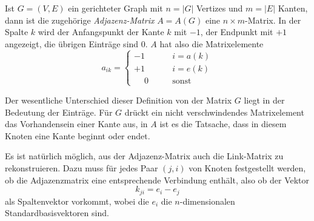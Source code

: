 \begin{definition}
\label{buch:def:adjazenz-matrix}
Ist $G=(V,E)$ ein gerichteter Graph mit $n=|G|$ Vertizes und $m=|E|$ Kanten,
dann ist die zugehörige {\em Adjazenz-Matrix} $A=A(G)$ eine $n\times m$-Matrix.
In der Spalte $k$ wird der Anfangspunkt der Kante $k$ mit $-1$, der Endpunkt
mit $+1$ angezeigt, die übrigen Einträge sind $0$.
$A$ hat also die Matrixelemente
\begin{equation}
a_{ik}
=
\begin{cases}
-1&\qquad i=a(k)\\
+1&\qquad i=e(k)\\
\phantom{+}0&\qquad\text{sonst}
\end{cases}
\label{buch:eqn:ajazenz-matrix}
\end{equation}
\end{definition}

Der wesentliche Unterschied dieser Definition von der Matrix $G$
liegt in der Bedeutung der Einträge.
Für $G$ drückt ein nicht verschwindendes Matrixelement das Vorhandensein
einer Kante aus, in $A$ ist es die Tatsache, dass in diesem Knoten
eine Kante beginnt oder endet.

Es ist natürlich möglich, aus der Adjazenz-Matrix auch die Link-Matrix
zu rekonstruieren.
Dazu muss für jedes Paar $(j,i)$ von Knoten festgestellt werden,
ob die Adjazenzmatrix eine entsprechende Verbindung enthält, also ob der
Vektor 
\[
k_{ji} = e_i - e_j
\]
als Spaltenvektor vorkommt, wobei die $e_i$ die $n$-dimensionalen
Standardbasisvektoren sind.


